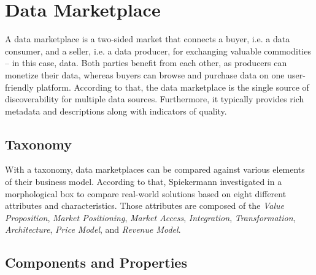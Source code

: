 \section{Data Marketplace}
\label{sec:marketplace}

A data marketplace is a two-sided market that connects a buyer, i.e. a data consumer, and a seller, i.e. a data producer, for exchanging valuable commodities -- in this case, data. Both parties benefit from each other, as producers can monetize their data, whereas buyers can browse and purchase data on one user-friendly platform. According to that, the data marketplace is the single source of discoverability for multiple data sources. Furthermore, it typically provides rich metadata and descriptions along with indicators of quality. 


\subsection{Taxonomy}
\label{subsec:taxonomy}

With a taxonomy, data marketplaces can be compared against various elements of their business model. According to that, Spiekermann \cite{spiekermannDataMarketplacesTrends2019} investigated in a morphological box to compare real-world solutions based on eight different attributes and characteristics. Those attributes are composed of the \emph{Value Proposition}, \emph{Market Positioning}, \emph{Market Access}, \emph{Integration}, \emph{Transformation}, \emph{Architecture}, \emph{Price Model}, and \emph{Revenue Model}.

\cite{fruhwirthDiscoveringBusinessModels}


\subsection{Components and Properties}
\label{subsec:elements-marketplace}



